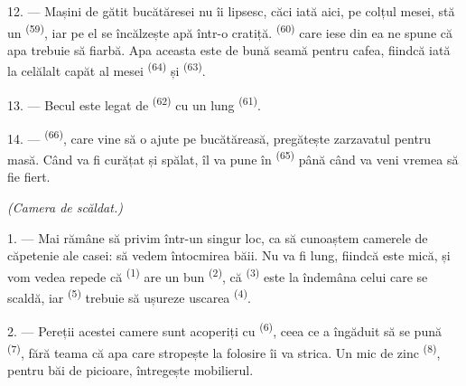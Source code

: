 12. --- Mașini de gătit bucătăresei nu îi lipsesc, căci iată aici, pe colțul mesei,
stă un  \textsuperscript{(59)}, iar pe el se încălzește apă
într-o cratiță.  \textsuperscript{(60)} care iese din ea ne spune
că apa trebuie să fiarbă. Apa aceasta este de bună seamă pentru cafea, fiindcă
iată la celălalt capăt al mesei  \textsuperscript{(64)}
și  \textsuperscript{(63)}.

13. --- Becul este legat de  \textsuperscript{(62)} cu un
 lung \textsuperscript{(61)}.

14. ---  \textsuperscript{(66)}, care vine să o ajute pe
bucătăreasă, pregătește zarzavatul pentru masă. Când va fi curățat și spălat, îl va
pune în  \textsuperscript{(65)} până când va veni vremea să fie
fiert.

\VUsaut{4.0mm}
{\centering\fontsize{10.2pt}{10.2pt}\selectfont{} \textit{(Camera de scăldat.)}\par}
\VUsaut{3.0mm}

1. --- Mai rămâne să privim într-un singur loc, ca să cunoaștem camerele de
căpetenie ale casei: să vedem întocmirea băii. Nu va fi lung, fiindcă este mică, și
vom vedea repede că  \textsuperscript{(1)} are un  bun
\textsuperscript{(2)}, că  \textsuperscript{(3)} este la
îndemâna celui care se scaldă, iar 
\textsuperscript{(5)} trebuie să ușureze uscarea 
\textsuperscript{(4)}.

2. --- Pereții acestei camere sunt acoperiți cu 
\textsuperscript{(6)}, ceea ce a îngăduit să se pună 
\textsuperscript{(7)}, fără teama că apa care stropește la folosire îi va strica. Un
 mic de zinc \textsuperscript{(8)}, pentru băi de picioare,
întregește mobilierul.
\VUsaut{6.0mm}
\VUfilet{22mm}
